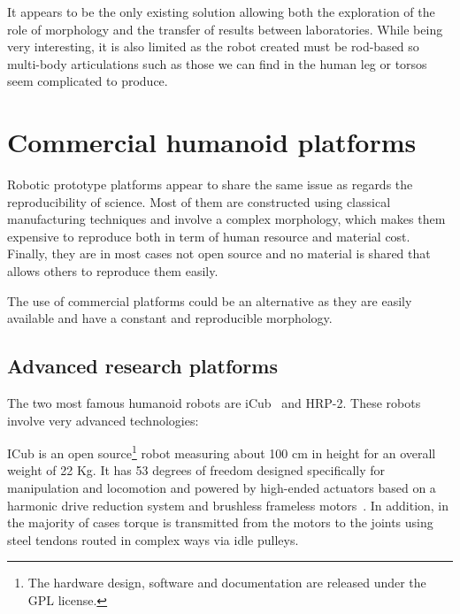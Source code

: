 \begin{figure}[tb]
\centering
    \hfil
    \caption{}
    \label{fig:locokit}
\end{figure}

It appears to be the only existing solution allowing both the exploration of the role of morphology and the transfer of results between laboratories. While being very interesting, it is also limited as the robot created must be rod-based so multi-body articulations such as those we can find in the human leg or torsos seem complicated to produce.


\section{Commercial humanoid platforms} %

Robotic prototype platforms appear to share the same issue as regards the reproducibility of science. Most of them are constructed using classical manufacturing techniques and involve a complex morphology, which makes them expensive to reproduce both in term of human resource and material cost. Finally, they are in most cases not open source and no material is shared that allows others to reproduce them easily.

The use of commercial platforms could be an alternative as they are easily available and have a constant and reproducible morphology.

\subsection{Advanced research platforms} %

The two most famous humanoid robots are iCub~\parencite{metta2008icub} and HRP-2. These robots involve very advanced technologies:

ICub is an open source\footnote{The hardware design, software and documentation are released under the GPL license.} robot measuring about 100 cm in height for an overall weight of 22 Kg. It has 53 degrees of freedom designed specifically for manipulation and locomotion and powered by high-ended actuators based on a harmonic drive reduction system and brushless frameless motors~\parencite{natale2013icub}. In addition, in the majority of cases torque is transmitted from the motors to the joints using steel tendons routed in complex ways via idle pulleys.

